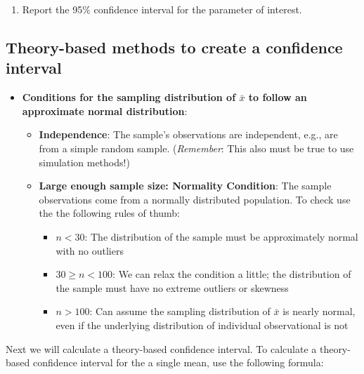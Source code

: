 \documentclass[
]{report}
\providecommand{\tightlist}{%
  \setlength{\itemsep}{0pt}\setlength{\parskip}{0pt}}
\begin{document}
\begin{enumerate}
\def\labelenumi{\arabic{enumi}.}
\setcounter{enumi}{2}
\tightlist
\item
  Report the 95\% confidence interval for the parameter of interest.
\end{enumerate}

\vspace{0.2in}

\subsection*{Theory-based methods to create a confidence interval}\label{theory-based-methods-to-create-a-confidence-interval}

\begin{itemize}
\item
  \textbf{Conditions for the sampling distribution of \(\bar{x}\) to follow an approximate normal distribution}:

  \begin{itemize}
  \item
    \textbf{Independence}: The sample's observations are independent, e.g., are from a simple random sample. (\emph{Remember}: This also must be true to use simulation methods!)
  \item
    \textbf{Large enough sample size: Normality Condition}: The sample observations come from a normally distributed population. To check use the the following rules of thumb:

    \begin{itemize}
    \item
      \(n < 30\): The distribution of the sample must be approximately normal with no outliers
    \item
      \(30 \ge n < 100\): We can relax the condition a little; the distribution of the sample must have no extreme outliers or skewness
    \item
      \(n > 100\): Can assume the sampling distribution of \(\bar{x}\) is nearly normal, even if the underlying distribution of individual observational is not
    \end{itemize}
  \end{itemize}
\end{itemize}

Next we will calculate a theory-based confidence interval. To calculate a theory-based confidence interval for the a single mean, use the following formula:
\end{document}
